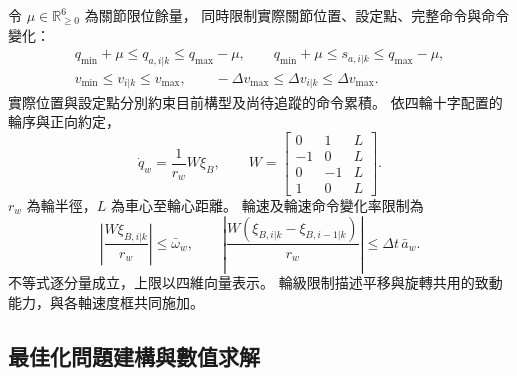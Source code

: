 令 $\mu\in\mathbb R_{\geq0}^6$ 為關節限位餘量，
同時限制實際關節位置、設定點、完整命令與命令變化：
\begin{equation}
    \begin{gathered}
        q_{\min}+\mu\leq q_{a,i|k}\leq q_{\max}-\mu,\qquad
        q_{\min}+\mu\leq s_{a,i|k}\leq q_{\max}-\mu,\\
        v_{\min}\leq v_{i|k}\leq v_{\max},\qquad
        -\Delta v_{\max}\leq\Delta v_{i|k}\leq\Delta v_{\max}.
    \end{gathered}
    \label{eq:ch3_joint_command_limits}
\end{equation}
實際位置與設定點分別約束目前構型及尚待追蹤的命令累積。
依四輪十字配置的輪序與正向約定，
\begin{equation}
    \dot q_w=\frac{1}{r_w}W\xi_B,\qquad
    W=
    \begin{bmatrix}
        0&1&L\\-1&0&L\\0&-1&L\\1&0&L
    \end{bmatrix}.
    \label{eq:ch3_wheel_command_mapping}
\end{equation}
$r_w$ 為輪半徑，$L$ 為車心至輪心距離。
輪速及輪速命令變化率限制為
\begin{equation}
    \left|\frac{W\xi_{B,i|k}}{r_w}\right|\leq\bar\omega_w,\qquad
    \left|\frac{W(\xi_{B,i|k}-\xi_{B,i-1|k})}{r_w}\right|
    \leq\Delta t\,\bar a_w .
    \label{eq:ch3_wheel_speed_acceleration_limits}
\end{equation}
不等式逐分量成立，上限以四維向量表示。
輪級限制描述平移與旋轉共用的致動能力，與各軸速度框共同施加。

\subsection{最佳化問題建構與數值求解}
\label{subsec:wholebody_qp_formulation}

